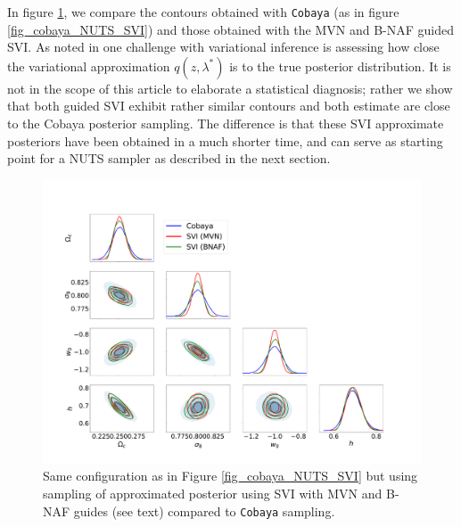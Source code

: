 \documentclass[twocolumn,twocolappendix,nofootinbib,iop]{openjournal}
\begin{document}
In figure \ref{fig_cobaya_SVIs}, we compare the contours obtained with \texttt{Cobaya} (as in figure \ref{fig_cobaya_NUTS_SVI}) and those obtained with the MVN and B-NAF guided SVI.  As noted in \cite{NEURIPS2020_7cac11e2} one challenge with variational inference is assessing how close the variational approximation $q(z,\lambda^\ast)$ is to the true posterior distribution. It is not in the scope of this article to elaborate a statistical diagnosis; rather we show that both guided SVI exhibit rather similar contours and both estimate are close to the Cobaya posterior sampling. The difference is that these SVI approximate posteriors have been obtained in a much shorter time, and can serve as starting point for a NUTS sampler as described in the next section. 
%
\begin{figure}
\centering
\includegraphics[width=1.5\columnwidth]{figures/fig_Cobaya_SVIs_v1.pdf}
\caption{Same configuration as in Figure \ref{fig_cobaya_NUTS_SVI} but using sampling of approximated posterior using SVI with MVN and B-NAF guides (see text) compared to \texttt{Cobaya} sampling.}
\label{fig_cobaya_SVIs}
\end{figure}
%
\end{document}

